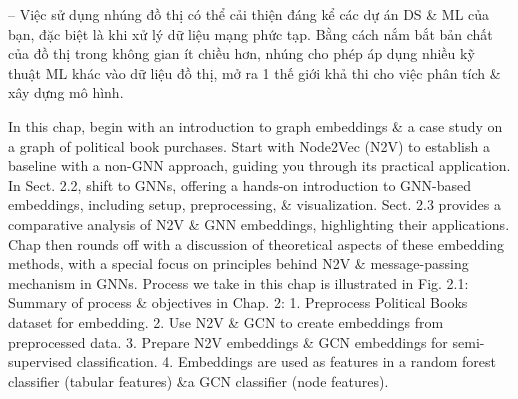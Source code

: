\documentclass{article}
\begin{document}
\begin{itemize}
    -- Việc sử dụng nhúng đồ thị có thể cải thiện đáng kể các dự án DS \& ML của bạn, đặc biệt là khi xử lý dữ liệu mạng phức tạp. Bằng cách nắm bắt bản chất của đồ thị trong không gian ít chiều hơn, nhúng cho phép áp dụng nhiều kỹ thuật ML khác vào dữ liệu đồ thị, mở ra 1 thế giới khả thi cho việc phân tích \& xây dựng mô hình.

    In this chap, begin with an introduction to graph embeddings \& a case study on a graph of political book purchases. Start with Node2Vec (N2V) to establish a baseline with a non-GNN approach, guiding you through its practical application. In Sect. 2.2, shift to GNNs, offering a hands-on introduction to GNN-based embeddings, including setup, preprocessing, \& visualization. Sect. 2.3 provides a comparative analysis of N2V \& GNN embeddings, highlighting their applications. Chap then rounds off with a discussion of theoretical aspects of these embedding methods, with a special focus on principles behind N2V \& message-passing mechanism in GNNs. Process we take in this chap is illustrated in {\sf Fig. 2.1: Summary of process \& objectives in Chap. 2: 1. Preprocess Political Books dataset for embedding. 2. Use N2V \& GCN to create embeddings from preprocessed data. 3. Prepare N2V embeddings \& GCN embeddings for semi-supervised classification. 4. Embeddings are used as features in a random forest classifier (tabular features) \&a GCN classifier (node features).}


\end{itemize}
\end{document}
